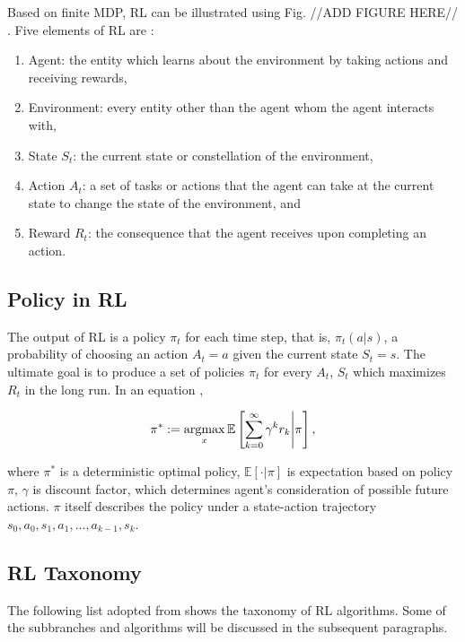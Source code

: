 Based on finite MDP, RL can be illustrated using Fig. //ADD FIGURE HERE// \cite{RL01}. Five elements of RL are :
\begin{enumerate}
	\item Agent: the entity which learns about the environment by taking actions and receiving rewards,
	\item Environment: every entity other than the agent whom the agent interacts with,
	\item State $S_t$: the current state or constellation of the environment,
	\item Action $A_t$: a set of tasks or actions that the agent can take at the current state to change the state of the environment, and
	\item Reward $R_t$: the consequence that the agent receives upon completing an action.
\end{enumerate}

\subsection{Policy in RL}
The output of RL is a policy $\pi_t$ for each time step, that is, $\pi_t(a|s)$, a probability of choosing an action $A_t = a$ given the current state $S_t = s$. The ultimate goal is to produce a set of policies $\pi_t$ for every $A_t$, $S_t$ which maximizes $R_t$ in the long run. In an equation \cite{QL03},

\[\pi^* := \operatorname*{argmax}_x \mathbb{E} \left[ \sum_{k=0}^{\infty} \gamma^k{}r_k \middle| \pi \right],\]

where $\pi^*$ is a deterministic optimal policy, $\mathbb{E}[\cdot|\pi]$ is expectation based on policy $\pi$, $\gamma$ is discount factor, which determines agent's consideration of possible future actions. $\pi$ itself describes the policy under a state-action trajectory $s_0, a_0, s_1, a_1, ..., a_{k-1}, s_k$.

\subsection{RL Taxonomy}
The following list adopted from \cite{RL07} shows the taxonomy of RL algorithms. Some of the subbranches and algorithms will be discussed in the subsequent paragraphs.

